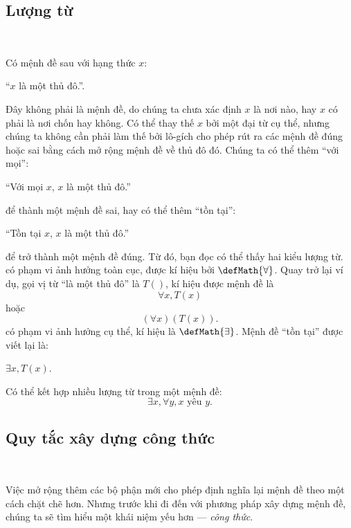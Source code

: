 \subsection{Lượng từ}

\ %

Có mệnh đề sau với hạng thức $x$:
\begin{center}
    ``$x$ là một thủ đô.''.
\end{center}
Đây không phải là mệnh đề, do chúng ta chưa xác định $x$ là nơi nào, hay $x$ có phải là nơi chốn hay không. Có thể thay thế $x$ bởi một đại từ cụ thể, nhưng chúng ta không cần phải làm thế bởi lô-gích cho phép rút ra các mệnh đề đúng hoặc sai bằng cách mở rộng mệnh đề về thủ đô đó. Chúng ta có thể thêm ``với mọi'':
\begin{center}
    ``Với mọi $x$, $x$ là một thủ đô.''
\end{center}
để thành một mệnh đề sai, hay có thể thêm ``tồn tại'':
\begin{center}
    ``Tồn tại $x$, $x$ là một thủ đô.''
\end{center}
để trở thành một mệnh đề đúng. Từ đó, bạn đọc có thể thấy hai kiểu lượng từ.  có phạm vi ảnh hưởng toàn cục, được kí hiệu bởi $\defMath{\forall}$. Quay trở lại ví dụ, gọi vị từ ``là một thủ đô'' là $T()$, kí hiệu được mệnh đề là
\begin{equation*}
    \forall x, T(x)
\end{equation*}
hoặc
\begin{equation*}
    (\forall x)(T(x)). 
\end{equation*}
 có phạm vi ảnh hưởng cụ thể, kí hiệu là $\defMath{\exists}$. Mệnh đề ``tồn tại'' được viết lại là:
\begin{center}
    $\exists x, T(x)$.
\end{center}
Có thể kết hợp nhiều lượng từ trong một mệnh đề:
\begin{equation*}
    \exists x, \forall y, x\text{ yêu }y.    
\end{equation*}

\subsection{Quy tắc xây dựng công thức}

\ 

Việc mở rộng thêm các bộ phận mới cho phép định nghĩa lại mệnh đề theo một cách chặt chẽ hơn. Nhưng trước khi đi đến với phương pháp xây dựng mệnh đề, chúng ta sẽ tìm hiểu một khái niệm yếu hơn --- \emph{công thức}.

